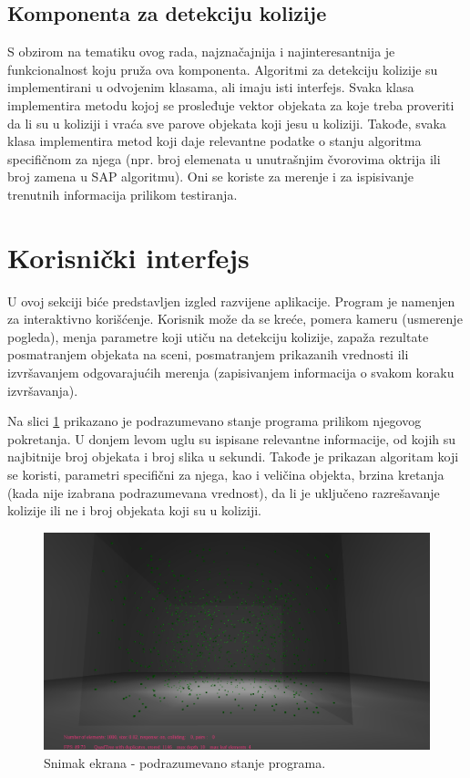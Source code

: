 \documentclass[12pt,oneside]{memoir}
\begin{document}
\subsection{Komponenta za detekciju kolizije}

S obzirom na tematiku ovog rada, najznačajnija i najinteresantnija je funkcionalnost koju pruža ova komponenta.
Algoritmi za detekciju kolizije su implementirani u odvojenim klasama, ali imaju isti interfejs.
Svaka klasa implementira metodu kojoj se prosleđuje vektor objekata za koje treba proveriti da li su u koliziji
i vraća sve parove objekata koji jesu u koliziji. Takođe, svaka klasa implementira metod koji daje relevantne podatke 
o stanju algoritma specifičnom za njega (npr. broj elemenata u unutrašnjim čvorovima oktrija ili broj 
zamena u SAP algoritmu). Oni se koriste za merenje i za ispisivanje trenutnih informacija prilikom testiranja.

\section{Korisnički interfejs}

U ovoj sekciji biće predstavljen izgled razvijene aplikacije. 
Program je namenjen za interaktivno korišćenje. 
Korisnik može da se kreće, pomera kameru (usmerenje pogleda), menja parametre koji utiču na detekciju kolizije,
zapaža rezultate posmatranjem objekata na sceni, posmatranjem prikazanih vrednosti ili izvršavanjem odgovarajućih merenja
(zapisivanjem informacija o svakom koraku izvršavanja).

Na slici \ref{fig:ssdefault} prikazano je podrazumevano stanje programa prilikom njegovog pokretanja.
U donjem levom uglu su ispisane relevantne informacije, od kojih su najbitnije broj objekata 
i broj slika u sekundi. Takođe je prikazan algoritam koji se koristi, parametri specifični za njega, kao 
i veličina objekta, brzina kretanja (kada nije izabrana podrazumevana vrednost),  da li je uključeno razrešavanje kolizije ili ne  i
broj objekata koji su u koliziji.

\begin{figure}[h!]
	\centerfloat
	\includegraphics[scale=0.3]{ssdefault.png}
	\caption{Snimak ekrana - podrazumevano stanje programa.}
	\label{fig:ssdefault}
\end{figure}
\end{document}
